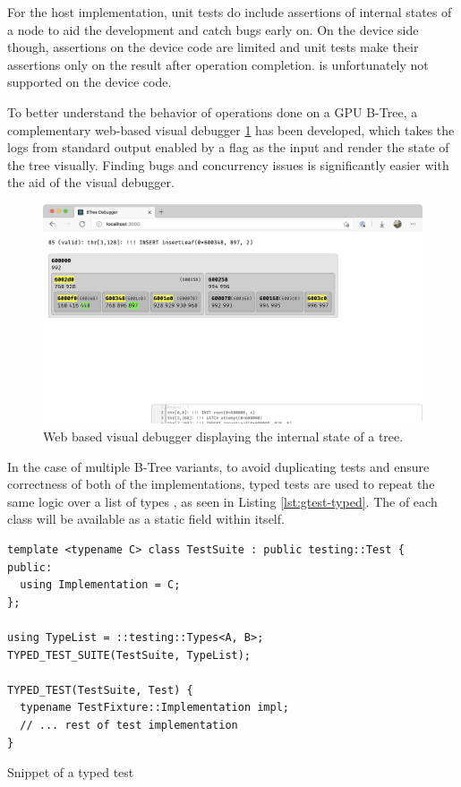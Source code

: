 For the host implementation, unit tests do include assertions of internal states of a node to aid the development and catch bugs early on. On the device side though, assertions on the device code are limited and unit tests make their assertions only on the result after operation completion.  is unfortunately not supported on the device code.

To better understand the behavior of operations done on a GPU B-Tree, a complementary web-based visual debugger \ref{figure:debugger} has been developed, which takes the logs from standard output enabled by a flag as the input and render the state of the tree visually. Finding bugs and concurrency issues is significantly easier with the aid of the visual debugger.

\begin{figure}
  \centering
  \includegraphics[width=\textwidth]{components/figure/debugger.png}
  \caption{Web based visual debugger displaying the internal state of a tree.}
  \label{figure:debugger}
\end{figure}

In the case of multiple B-Tree variants, to avoid duplicating tests and ensure correctness of both of the implementations, typed tests are used to repeat the same logic over a list of types \cite{gtest-advanced}, as seen in Listing \ref{lst:gtest-typed}. The  of each class will be available as a static field within  itself.

\begin{listing}
  \begin{verbatim}
template <typename C> class TestSuite : public testing::Test {
public:
  using Implementation = C;
};

using TypeList = ::testing::Types<A, B>;
TYPED_TEST_SUITE(TestSuite, TypeList);

TYPED_TEST(TestSuite, Test) {
  typename TestFixture::Implementation impl;
  // ... rest of test implementation
}
    \end{verbatim}
  \caption{Snippet of a  typed test}\label{lst:gtest-typed}
\end{listing}

